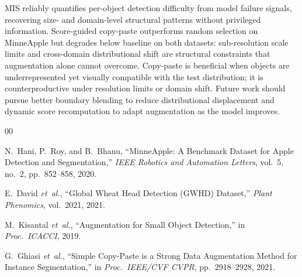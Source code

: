 \documentclass[conference]{IEEEtran}
\begin{document}
MIS reliably quantifies per-object detection difficulty from model
failure signals, recovering size- and domain-level structural
patterns without privileged information. Score-guided copy-paste
outperforms random selection on MinneApple but degrades below
baseline on both datasets: sub-resolution scale limits and
cross-domain distributional shift are structural constraints that
augmentation alone cannot overcome. Copy-paste is beneficial when
objects are underrepresented yet visually compatible with the test
distribution; it is counterproductive under resolution limits or
domain shift. Future work should pursue better boundary blending to
reduce distributional displacement and dynamic score recomputation
to adapt augmentation as the model improves.

\begin{thebibliography}{00}

N.~Hani, P.~Roy, and B.~Bhanu,
``MinneApple: A Benchmark Dataset for Apple Detection and Segmentation,''
\textit{IEEE Robotics and Automation Letters},
vol.~5, no.~2, pp.~852--858, 2020.

E.~David \textit{et~al.},
``Global Wheat Head Detection (GWHD) Dataset,''
\textit{Plant Phenomics}, vol.~2021, 2021.

M.~Kisantal \textit{et~al.},
``Augmentation for Small Object Detection,''
in \textit{Proc.\ ICACCI}, 2019.

G.~Ghiasi \textit{et~al.},
``Simple Copy-Paste is a Strong Data Augmentation Method
for Instance Segmentation,''
in \textit{Proc.\ IEEE/CVF CVPR}, pp.~2918--2928, 2021.

\end{thebibliography}
\end{document}
